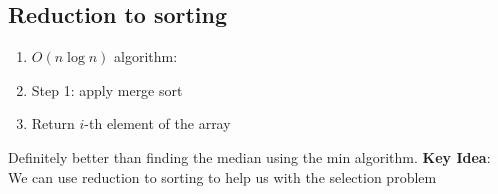 \documentclass{article}
\begin{document}
\subsection*{Reduction to sorting}

\begin{enumerate}
    \item $O(n \log n)$ algorithm:
    \item Step 1: apply merge sort
    \item Return $i$-th element of the array
\end{enumerate}

Definitely better than finding the median using the min algorithm.
\textbf{Key Idea}: We can use reduction to sorting to help us with the selection problem
\end{document}
